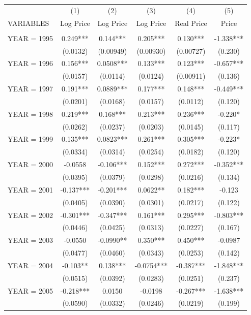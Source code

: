 \begin{tabular}{lccccc} \hline
 & (1) & (2) & (3) & (4) & (5) \\
VARIABLES & Log Price & Log Price & Log Price & Real Price & Price \\ \hline
 &  &  &  &  &  \\
YEAR = 1995 & 0.249*** & 0.144*** & 0.205*** & 0.130*** & -1.338*** \\
 & (0.0132) & (0.00949) & (0.00930) & (0.00727) & (0.230) \\
YEAR = 1996 & 0.156*** & 0.0508*** & 0.133*** & 0.123*** & -0.657*** \\
 & (0.0157) & (0.0114) & (0.0124) & (0.00911) & (0.136) \\
YEAR = 1997 & 0.191*** & 0.0889*** & 0.177*** & 0.148*** & -0.449*** \\
 & (0.0201) & (0.0168) & (0.0157) & (0.0112) & (0.120) \\
YEAR = 1998 & 0.219*** & 0.168*** & 0.213*** & 0.236*** & -0.220* \\
 & (0.0262) & (0.0237) & (0.0203) & (0.0145) & (0.117) \\
YEAR = 1999 & 0.135*** & 0.0823*** & 0.261*** & 0.305*** & -0.223* \\
 & (0.0334) & (0.0314) & (0.0254) & (0.0182) & (0.120) \\
YEAR = 2000 & -0.0558 & -0.106*** & 0.152*** & 0.272*** & -0.352*** \\
 & (0.0395) & (0.0379) & (0.0298) & (0.0216) & (0.134) \\
YEAR = 2001 & -0.137*** & -0.201*** & 0.0622** & 0.182*** & -0.123 \\
 & (0.0405) & (0.0390) & (0.0301) & (0.0217) & (0.122) \\
YEAR = 2002 & -0.301*** & -0.347*** & 0.161*** & 0.295*** & -0.803*** \\
 & (0.0446) & (0.0425) & (0.0313) & (0.0227) & (0.167) \\
YEAR = 2003 & -0.0550 & -0.0990** & 0.350*** & 0.450*** & -0.0987 \\
 & (0.0477) & (0.0460) & (0.0343) & (0.0253) & (0.142) \\
YEAR = 2004 & -0.103** & 0.138*** & -0.0754*** & -0.387*** & -1.848*** \\
 & (0.0515) & (0.0392) & (0.0283) & (0.0251) & (0.237) \\
YEAR = 2005 & -0.218*** & 0.0150 & -0.0198 & -0.267*** & -1.638*** \\
 & (0.0590) & (0.0332) & (0.0246) & (0.0219) & (0.199) \\

\end{tabular}
